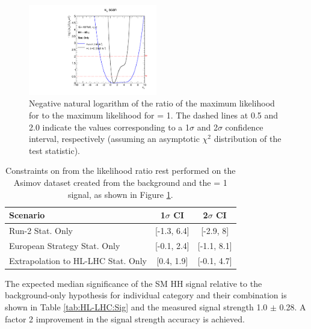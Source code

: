 \begin{figure}[htbp]
    \centering
    \includegraphics[width=0.5\textwidth]{Ch6/Img/likelihood_subplot.pdf}
    \begin{tcolorbox}[colback=black!5!white, colframe=white!75!black]
    \caption{Negative natural logarithm of the ratio of the maximum likelihood for \kl to the maximum likelihood for \kl= 1. The dashed lines at 0.5 and 2.0 indicate the values corresponding to a 1$\sigma$ and 2$\sigma$ confidence interval, respectively (assuming an asymptotic $\chi^2$ distribution of the test statistic).}
    \label{fig:HL-LHC:LH}
    \end{tcolorbox}
\end{figure}

\begin{table}[htbp]
    \centering
    \begin{tabular}{lcc}
    \hline\hline 
        Scenario & 1$\sigma$ CI & 2$\sigma$ CI \\
    \hline    
        Run-2 Stat. Only & [-1.3, 6.4]  & [-2.9, 8] \\ 
        European Strategy Stat. Only & [-0.1, 2.4] & [-1.1, 8.1] \\
        Extrapolation to HL-LHC Stat. Only & [0.4, 1.9] & [-0.1, 4.7] \\
    \hline\hline 
    \end{tabular}
    \begin{tcolorbox}[colback=black!5!white, colframe=white!75!black]
    \caption{Constraints on \kl from the likelihood ratio rest performed on the Asimov dataset created from the background and the \kl= 1 signal, as shown in Figure \ref{fig:HL-LHC:LH}.}
    \label{tab:HL-LHC:kl}
    \end{tcolorbox}
\end{table}

The expected median significance of the SM HH signal relative to the background-only hypothesis for individual category and their combination is shown in Table \ref{tab:HL-LHC:Sig} and the measured signal strength 1.0 $\pm$ 0.28. A factor 2 improvement in the signal strength accuracy is achieved. 

